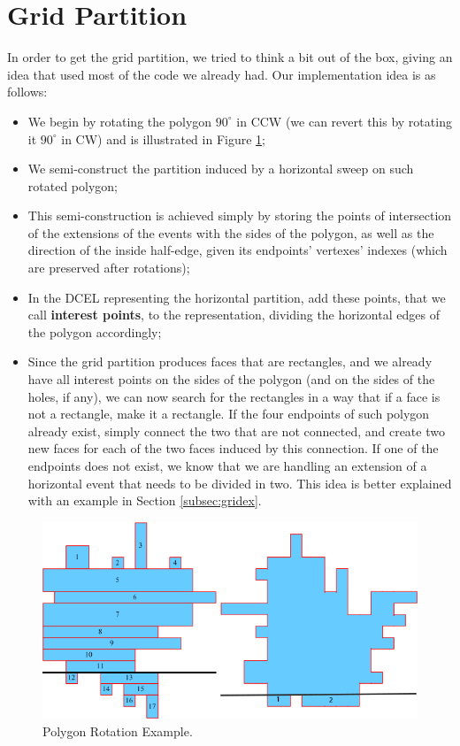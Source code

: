 \documentclass[12pt,a4paper,oneside]{article}
\begin{document}
\section{Grid Partition}\label{sec:grid}

In order to get the grid partition, we tried to think a bit out of the box, giving an idea that used most of the code we already had. Our implementation idea is as follows:

\begin{itemize}
	\item We begin by rotating the polygon $90^{\circ}$ in CCW (we can revert this by rotating it $90^{\circ}$ in CW) and is illustrated in Figure \ref{fig:rot};
	\item We semi-construct the partition induced by a horizontal sweep on such rotated polygon;
	\item This semi-construction is achieved simply by storing the points of intersection of the extensions of the events with the sides of the polygon, as well as the direction of the inside half-edge, given its endpoints' vertexes' indexes (which are preserved after rotations);
	\item In the DCEL representing the horizontal partition, add these points, that we call \textbf{interest points}, to the representation, dividing the horizontal edges of the polygon accordingly;
	\item Since the grid partition produces faces that are rectangles, and we already have all interest points on the sides of the polygon (and on the sides of the holes, if any), we can now search for the rectangles in a way that if a face is not a rectangle, make it a rectangle. If the four endpoints of such polygon already exist, simply connect the two that are not connected, and create two new faces for each of the two faces induced by this connection. If one of the endpoints does not exist, we know that we are handling an extension of a horizontal event that needs to be divided in two. This idea is better explained with an example in Section \ref{subsec:gridex}.
\end{itemize}

\begin{figure}[h!]
  \centering \includegraphics[scale=0.5]{rotatedPoly.png}
  \caption{Polygon Rotation Example.}
  \label{fig:rot}
\end{figure}
\end{document}
